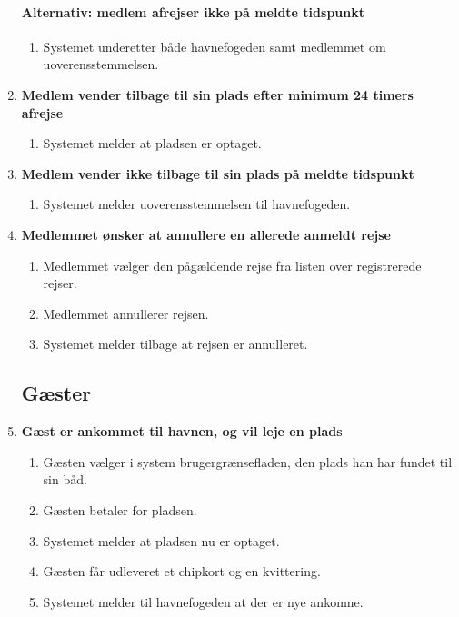 \begin{enumerate}
    \paragraph{Alternativ: medlem afrejser ikke på meldte tidspunkt}
      \begin{enumerate}
        \item Systemet underetter både havnefogeden samt medlemmet om uoverensstemmelsen.
      \end{enumerate}


    \item{\bf{Medlem vender tilbage til sin plads efter minimum 24 timers afrejse}}
      \begin{enumerate}
        \item Systemet melder at pladsen er optaget.
      \end{enumerate}


    \item{\bf{Medlem vender ikke tilbage til sin plads på meldte tidspunkt}}
      \begin{enumerate}
        \item Systemet melder uoverensstemmelsen til havnefogeden.
      \end{enumerate}


    \item{\bf{Medlemmet ønsker at annullere en allerede anmeldt rejse}}
      \begin{enumerate}
        \item Medlemmet vælger den pågældende rejse fra listen over registrerede rejser.
        \item Medlemmet annullerer rejsen.
        \item Systemet melder tilbage at rejsen er annulleret.
      \end{enumerate}


\subsection{Gæster}


    \item{\bf{Gæst er ankommet til havnen, og vil leje en plads}}
      \begin{enumerate}
        \item Gæsten vælger i system brugergrænsefladen, den plads han har fundet til sin båd.
        \item Gæsten betaler for pladsen.
        \item Systemet melder at pladsen nu er optaget.
        \item Gæsten får udleveret et chipkort og en kvittering.
        \item Systemet melder til havnefogeden at der er nye ankomne.
      \end{enumerate}


\end{enumerate}
